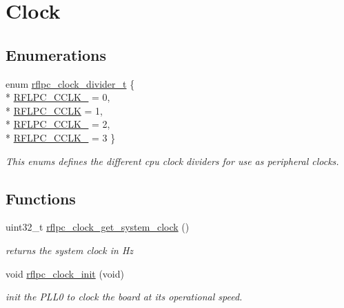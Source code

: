 \hypertarget{group__clock}{\section{Clock}
\label{group__clock}
}
\subsection*{Enumerations}
\begin{DoxyCompactItemize}
\item 
enum \hyperlink{group__clock_gaf3b7fc561cd12dfdff9f7c1357c3f016}{rflpc\-\_\-clock\-\_\-divider\-\_\-t} \{ \\*
\hyperlink{group__clock_ggaf3b7fc561cd12dfdff9f7c1357c3f016a93a233b505c3659a81d4674b91d0daad}{R\-F\-L\-P\-C\-\_\-\-C\-C\-L\-K\-\_} =  0, 
\\*
\hyperlink{group__clock_ggaf3b7fc561cd12dfdff9f7c1357c3f016a9cc79356f5343282b73a36bd7e6115ba}{R\-F\-L\-P\-C\-\_\-\-C\-C\-L\-K} =  1, 
\\*
\hyperlink{group__clock_ggaf3b7fc561cd12dfdff9f7c1357c3f016aa074865ba21da15526a6a4cea10d9e7c}{R\-F\-L\-P\-C\-\_\-\-C\-C\-L\-K\-\_} =  2, 
\\*
\hyperlink{group__clock_ggaf3b7fc561cd12dfdff9f7c1357c3f016a3eac4d3b6b5c061897a63c1dac00616c}{R\-F\-L\-P\-C\-\_\-\-C\-C\-L\-K\-\_} =  3
 \}
\begin{DoxyCompactList}\small\item\em This enums defines the different cpu clock dividers for use as peripheral clocks. \end{DoxyCompactList}\end{DoxyCompactItemize}
\subsection*{Functions}
\begin{DoxyCompactItemize}
\item 
\hypertarget{group__clock_ga7e496bb7f41ac1ff5ab79f7bd1d8ef47}{uint32\-\_\-t \hyperlink{group__clock_ga7e496bb7f41ac1ff5ab79f7bd1d8ef47}{rflpc\-\_\-clock\-\_\-get\-\_\-system\-\_\-clock} ()}\label{group__clock_ga7e496bb7f41ac1ff5ab79f7bd1d8ef47}

\begin{DoxyCompactList}\small\item\em returns the system clock in Hz \end{DoxyCompactList}\item 
void \hyperlink{group__clock_ga00ad4cbad1cd13962e283bdfb3451f7f}{rflpc\-\_\-clock\-\_\-init} (void)
\begin{DoxyCompactList}\small\item\em init the P\-L\-L0 to clock the board at its operational speed. \end{DoxyCompactList}\end{DoxyCompactItemize}



